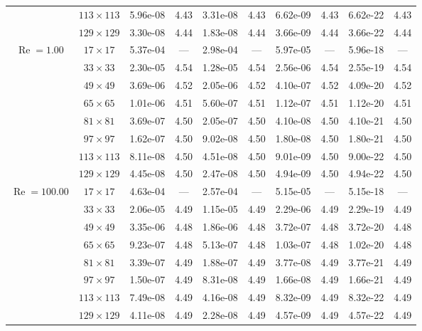 \documentclass[preprint, 12pt]{elsarticle}
\begin{document}
{\begin{center}
\begin{table}[H]
{\begin{tabular*}{\textwidth}{@{\extracolsep\fill}cccccccccc@{}}
    & $113\times 113$ & 5.96e-08 & 4.43 & 3.31e-08 & 4.43 & 6.62e-09 & 4.43 & 6.62e-22 & 4.43 \\
    & $129\times 129$ & 3.30e-08 & 4.44 & 1.83e-08 & 4.44 & 3.66e-09 & 4.44 & 3.66e-22 & 4.44 \\
    \hline\hline
    \multirow{7}{*}{$\operatorname{Re}=1.00$} & $17\times 17$ & 5.37e-04 & --- & 2.98e-04 & --- & 5.97e-05 & --- & 5.96e-18 & --- \\
    & $33\times 33$ & 2.30e-05 & 4.54 & 1.28e-05 & 4.54 & 2.56e-06 & 4.54 & 2.55e-19 & 4.54 \\
    & $49\times 49$ & 3.69e-06 & 4.52 & 2.05e-06 & 4.52 & 4.10e-07 & 4.52 & 4.09e-20 & 4.52 \\
    \multirow{3}{*}{$\operatorname{Wi}=10$} & $65\times 65$ & 1.01e-06 & 4.51 & 5.60e-07 & 4.51 & 1.12e-07 & 4.51 & 1.12e-20 & 4.51 \\
    & $81\times 81$ & 3.69e-07 & 4.50 & 2.05e-07 & 4.50 & 4.10e-08 & 4.50 & 4.10e-21 & 4.50 \\
    & $97\times 97$ & 1.62e-07 & 4.50 & 9.02e-08 & 4.50 & 1.80e-08 & 4.50 & 1.80e-21 & 4.50 \\
    & $113\times 113$ & 8.11e-08 & 4.50 & 4.51e-08 & 4.50 & 9.01e-09 & 4.50 & 9.00e-22 & 4.50 \\
    & $129\times 129$ & 4.45e-08 & 4.50 & 2.47e-08 & 4.50 & 4.94e-09 & 4.50 & 4.94e-22 & 4.50 \\
    \hline
    \multirow{7}{*}{$\operatorname{Re}=100.00$} & $17\times 17$ & 4.63e-04 & --- & 2.57e-04 & --- & 5.15e-05 & --- & 5.15e-18 & --- \\
    & $33\times 33$ & 2.06e-05 & 4.49 & 1.15e-05 & 4.49 & 2.29e-06 & 4.49 & 2.29e-19 & 4.49 \\
    & $49\times 49$ & 3.35e-06 & 4.48 & 1.86e-06 & 4.48 & 3.72e-07 & 4.48 & 3.72e-20 & 4.48 \\
    \multirow{3}{*}{$\operatorname{Wi}=10$} & $65\times 65$ & 9.23e-07 & 4.48 & 5.13e-07 & 4.48 & 1.03e-07 & 4.48 & 1.02e-20 & 4.48 \\
    & $81\times 81$ & 3.39e-07 & 4.49 & 1.88e-07 & 4.49 & 3.77e-08 & 4.49 & 3.77e-21 & 4.49 \\
    & $97\times 97$ & 1.50e-07 & 4.49 & 8.31e-08 & 4.49 & 1.66e-08 & 4.49 & 1.66e-21 & 4.49 \\
    & $113\times 113$ & 7.49e-08 & 4.49 & 4.16e-08 & 4.49 & 8.32e-09 & 4.49 & 8.32e-22 & 4.49 \\
    & $129\times 129$ & 4.11e-08 & 4.49 & 2.28e-08 & 4.49 & 4.57e-09 & 4.49 & 4.57e-22 & 4.49 \\

\end{tabular*}}
\end{table}
\end{center}}
\end{document}
